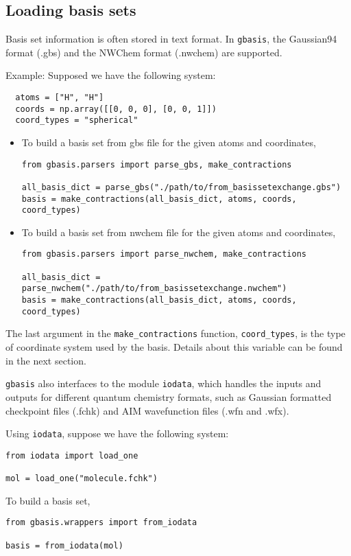 \documentclass[letterpaper]{article}
\begin{document}
\subsection{Loading basis sets}
Basis set information is often stored in text format.
In \verb|gbasis|, the Gaussian94 format (.gbs) and the NWChem format (.nwchem) are
supported.

Example:
Supposed we have the following system:
\begin{lstlisting}
  atoms = ["H", "H"]
  coords = np.array([[0, 0, 0], [0, 0, 1]])
  coord_types = "spherical"
\end{lstlisting}
\begin{itemize}
\item To build a basis set from gbs file for the given atoms and coordinates,
  \begin{lstlisting}[xleftmargin=-25pt]
from gbasis.parsers import parse_gbs, make_contractions

all_basis_dict = parse_gbs("./path/to/from_basissetexchange.gbs")
basis = make_contractions(all_basis_dict, atoms, coords, coord_types)
\end{lstlisting}
\item To build a basis set from nwchem file for the given atoms and coordinates,
  \begin{lstlisting}[xleftmargin=-25pt]
from gbasis.parsers import parse_nwchem, make_contractions

all_basis_dict = parse_nwchem("./path/to/from_basissetexchange.nwchem")
basis = make_contractions(all_basis_dict, atoms, coords, coord_types)
\end{lstlisting}
\end{itemize}
The last argument in the \verb|make_contractions| function, \verb|coord_types|, is the type of coordinate system used by the basis. Details about this variable can be found in the next section.

\verb|gbasis| also interfaces to the module \verb|iodata|, which handles the
inputs and outputs for different quantum chemistry formats, such as Gaussian
formatted checkpoint files (.fchk) and AIM wavefunction files (.wfn and .wfx).

Using \verb|iodata|, suppose we have the following system:
\begin{lstlisting}
from iodata import load_one

mol = load_one("molecule.fchk")
\end{lstlisting}
To build a basis set,
\begin{lstlisting}
from gbasis.wrappers import from_iodata

basis = from_iodata(mol)
\end{lstlisting}
\end{document}
